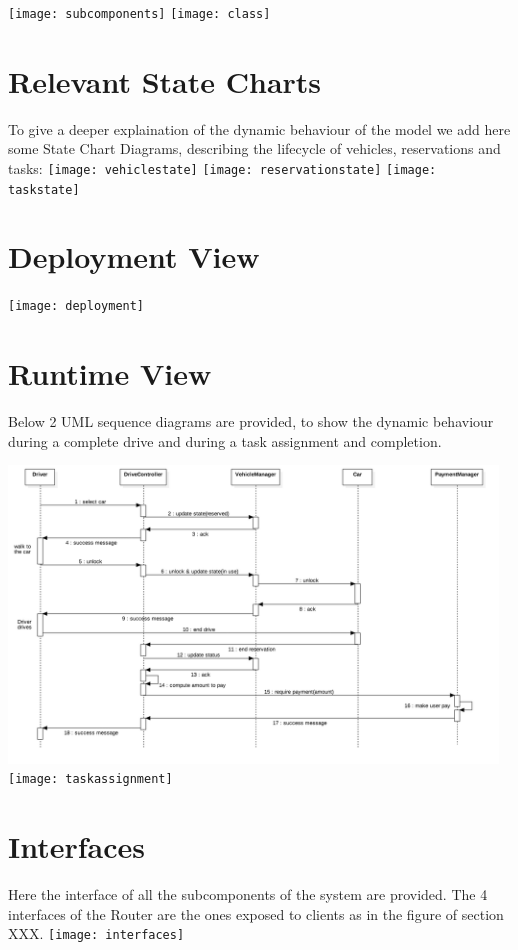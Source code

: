 \texttt{[image: subcomponents]}
\texttt{[image: class]}

\section{Relevant State Charts}
To give a deeper explaination of the dynamic behaviour of the model we add here some State Chart Diagrams, describing the lifecycle of vehicles, reservations and tasks:
\texttt{[image: vehiclestate]}
\texttt{[image: reservationstate]}
\texttt{[image: taskstate]}

\section{Deployment View}
\texttt{[image: deployment]}

\section{Runtime View}
Below 2 UML sequence diagrams are provided, to show the dynamic behaviour during a complete drive and during a task assignment and completion.

\includegraphics[width=13cm,keepaspectratio]{drive}
\texttt{[image: taskassignment]}

\section{Interfaces}
Here the interface of all the subcomponents of the system are provided. The 4 interfaces of the Router are the ones exposed to clients as in the figure of section XXX.
\texttt{[image: interfaces]}

